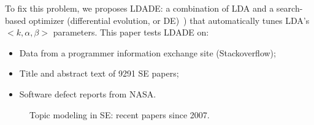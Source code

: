 \documentclass[10pt,conference]{IEEEtran}
\newcommand{\bi}{\begin{itemize}}
\newcommand{\ei}{\end{itemize}}
\theoremstyle{break}
\begin{document}
To fix this problem,
we proposes LDADE: a  combination of LDA and a search-based optimizer (differential evolution, or DE)~\cite{storn1997differential})
that automatically tunes LDA's \mbox{$<k,\alpha,\beta>$} parameters. This paper tests LDADE on:
\bi
\item Data from a programmer information exchange site (Stackoverflow);
  \item Title and abstract text of
    9291 SE papers;
  \item Software defect reports from NASA.
    \ei


    

\begin{figure}[!b]
  \centering
  \caption{Topic modeling in SE: recent papers since 2007.}
  \label{fig:survey1}
\end{figure}
\end{document}
